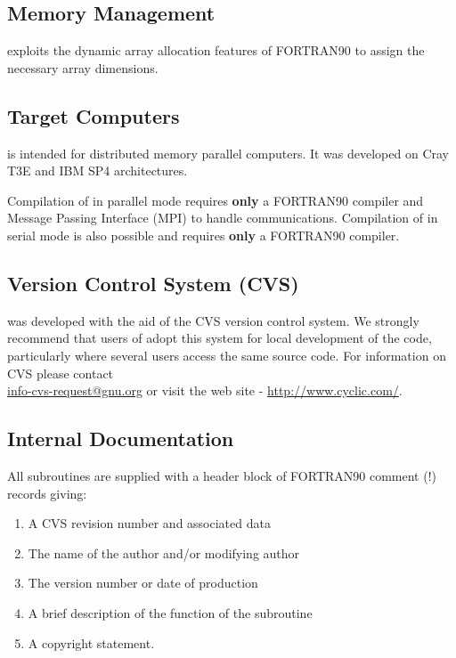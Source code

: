 \subsection{Memory Management}

\D exploits the dynamic array allocation features of FORTRAN90
 to assign the necessary array dimensions.

\subsection{Target Computers}

\D is intended for distributed memory parallel computers.  It was
developed on Cray T3E and IBM SP4 architectures.

Compilation of \D in parallel mode requires {\bf only} a FORTRAN90
 compiler and Message Passing Interface (MPI) to handle
communications.  Compilation of \D in serial mode is also possible
and requires {\bf only} a FORTRAN90  compiler.

\subsection{Version Control System (CVS)}

\D was developed with the aid of the CVS version control
system. We strongly recommend that users of \D adopt this system for
local development of the code, particularly where several users
access the same source code.  For information on CVS
please contact \\
\noindent \href{mailto:info-cvs-request@gnu.org}{info-cvs-request@gnu.org}
or visit the web site - \href{http://www.cyclic.com/}{http://www.cyclic.com/}.

\subsection{Internal Documentation}

All subroutines are supplied with a header block of FORTRAN90
 comment (!) records giving:
\begin{enumerate}
\item A CVS revision number and associated data
\item The name of the author and/or modifying author
\item The version number or date of production
\item A brief description of the function of the subroutine
\item A copyright statement.
\end{enumerate}


